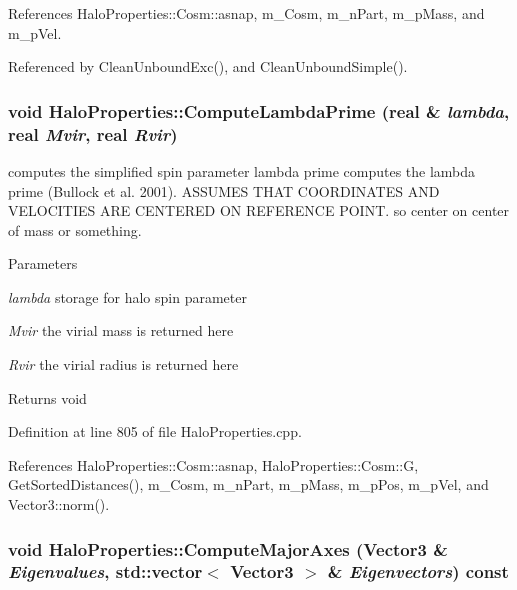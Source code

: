 References HaloProperties::Cosm::asnap, m\_\-Cosm, m\_\-nPart, m\_\-pMass, and m\_\-pVel.



Referenced by CleanUnboundExc(), and CleanUnboundSimple().

\subsubsection[{ComputeLambdaPrime}]{\setlength{\rightskip}{0pt plus 5cm}void HaloProperties::ComputeLambdaPrime ({\bf real} \& {\em lambda}, \/  {\bf real} {\em Mvir}, \/  {\bf real} {\em Rvir})}\label{classHaloProperties_a675fb78ade0e9497338464fc275c2fd5}


computes the simplified spin parameter lambda prime computes the lambda prime (Bullock et al. 2001). ASSUMES THAT COORDINATES AND VELOCITIES ARE CENTERED ON REFERENCE POINT. so center on center of mass or something. 


\begin{DoxyParams}{Parameters}
\item[{\em lambda}]storage for halo spin parameter \item[{\em Mvir}]the virial mass is returned here \item[{\em Rvir}]the virial radius is returned here \end{DoxyParams}
\begin{DoxyReturn}{Returns}
void 
\end{DoxyReturn}


Definition at line 805 of file HaloProperties.cpp.



References HaloProperties::Cosm::asnap, HaloProperties::Cosm::G, GetSortedDistances(), m\_\-Cosm, m\_\-nPart, m\_\-pMass, m\_\-pPos, m\_\-pVel, and Vector3::norm().

\subsubsection[{ComputeMajorAxes}]{\setlength{\rightskip}{0pt plus 5cm}void HaloProperties::ComputeMajorAxes ({\bf Vector3} \& {\em Eigenvalues}, \/  std::vector$<$ {\bf Vector3} $>$ \& {\em Eigenvectors}) const}\label{classHaloProperties_aadfc56fbb88702866ade01fc1168a53e}


